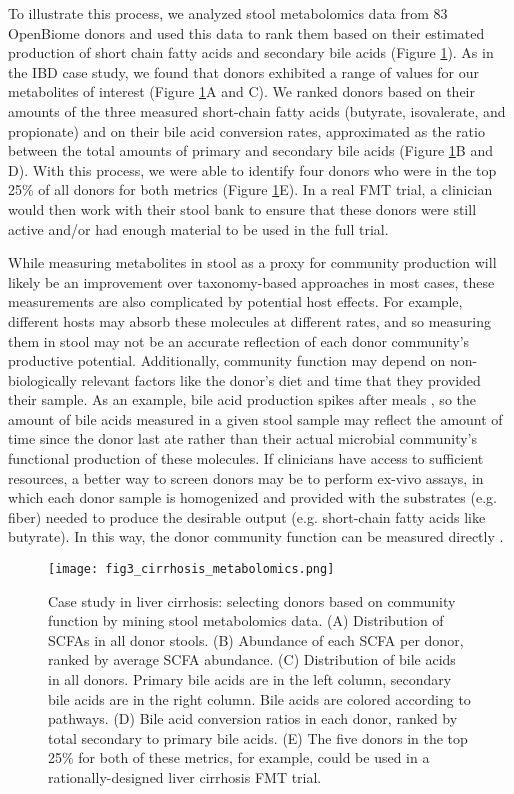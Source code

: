 To illustrate this process, we analyzed stool metabolomics data from 83 OpenBiome donors and used this data to rank them based on their estimated production of short chain fatty acids and secondary bile acids (Figure \ref{fig:bn10-liver}).
As in the IBD case study, we found that donors exhibited a range of values for our metabolites of interest (Figure \ref{fig:bn10-liver}A and C).
We ranked donors based on their amounts of the three measured short-chain fatty acids (butyrate, isovalerate, and propionate) and on their bile acid conversion rates, approximated as the ratio between the total amounts of primary and secondary bile acids (Figure \ref{fig:bn10-liver}B and D).
With this process, we were able to identify four donors who were in the top 25\% of all donors for both metrics (Figure \ref{fig:bn10-liver}E).
In a real FMT trial, a clinician would then work with their stool bank to ensure that these donors were still active and/or had enough material to be used in the full trial.

While measuring metabolites in stool as a proxy for community production will likely be an improvement over taxonomy-based approaches in most cases, these measurements are also complicated by potential host effects.
For example, different hosts may absorb these molecules at different rates, and so measuring them in stool may not be an accurate reflection of each donor community's productive potential.
Additionally, community function may depend on non-biologically relevant factors like the donor's diet and time that they provided their sample. As an example, bile acid production spikes after meals \cite{Hofmann1989}, so the amount of bile acids measured in a given stool sample may reflect the amount of time since the donor last ate rather than their actual microbial community's functional production of these molecules.
If clinicians have access to sufficient resources, a better way to screen donors may be to perform ex-vivo assays, in which each donor sample is homogenized and provided with the substrates (e.g. fiber) needed to produce the desirable output (e.g. short-chain fatty acids like butyrate).
In this way, the donor community function can be measured directly \cite{Wang1993,Chen2017}.

\begin{figure}
    \begin{center}
    \texttt{[image: fig3\_cirrhosis\_metabolomics.png]}
    \caption{Case study in liver cirrhosis: selecting donors based on community function by mining stool metabolomics data. (A) Distribution of SCFAs in all donor stools. (B) Abundance of each SCFA per donor, ranked by average SCFA abundance. (C) Distribution of bile acids in all donors. Primary bile acids are in the left column, secondary bile acids are in the right column. Bile acids are colored according to pathways. (D) Bile acid conversion ratios in each donor, ranked by total secondary to primary bile acids. (E) The five donors in the top 25\% for both of these metrics, for example, could be used in a rationally-designed liver cirrhosis FMT trial.}\label{fig:bn10-liver}
    \end{center}
\end{figure}

